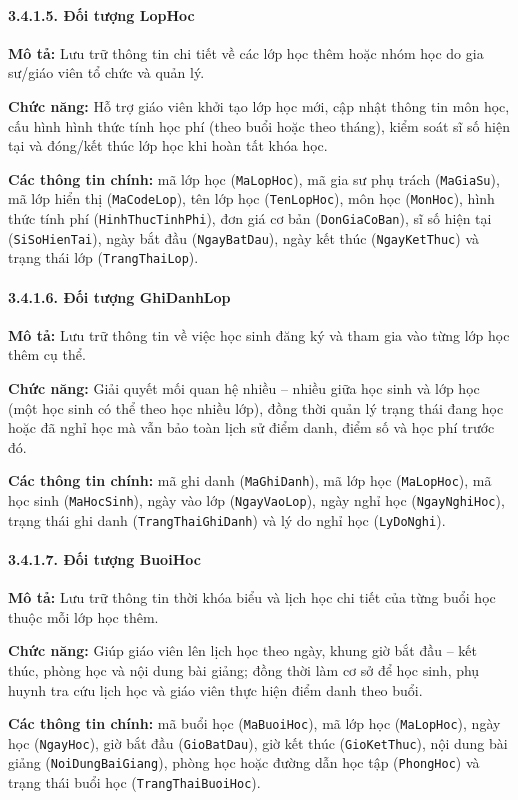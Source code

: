 \paragraph{3.4.1.5. Đối tượng LopHoc}\mbox{}\par
\textbf{Mô tả:} Lưu trữ thông tin chi tiết về các lớp học thêm hoặc nhóm học do gia sư/giáo viên tổ chức và quản lý.\par
\textbf{Chức năng:} Hỗ trợ giáo viên khởi tạo lớp học mới, cập nhật thông tin môn học, cấu hình hình thức tính học phí (theo buổi hoặc theo tháng), kiểm soát sĩ số hiện tại và đóng/kết thúc lớp học khi hoàn tất khóa học.\par
\textbf{Các thông tin chính:} mã lớp học (\texttt{MaLopHoc}), mã gia sư phụ trách (\texttt{MaGiaSu}), mã lớp hiển thị (\texttt{MaCodeLop}), tên lớp học (\texttt{TenLopHoc}), môn học (\texttt{MonHoc}), hình thức tính phí (\texttt{HinhThucTinhPhi}), đơn giá cơ bản (\texttt{DonGiaCoBan}), sĩ số hiện tại (\texttt{SiSoHienTai}), ngày bắt đầu (\texttt{NgayBatDau}), ngày kết thúc (\texttt{NgayKetThuc}) và trạng thái lớp (\texttt{TrangThaiLop}).

\paragraph{3.4.1.6. Đối tượng GhiDanhLop}\mbox{}\par
\textbf{Mô tả:} Lưu trữ thông tin về việc học sinh đăng ký và tham gia vào từng lớp học thêm cụ thể.\par
\textbf{Chức năng:} Giải quyết mối quan hệ nhiều -- nhiều giữa học sinh và lớp học (một học sinh có thể theo học nhiều lớp), đồng thời quản lý trạng thái đang học hoặc đã nghỉ học mà vẫn bảo toàn lịch sử điểm danh, điểm số và học phí trước đó.\par
\textbf{Các thông tin chính:} mã ghi danh (\texttt{MaGhiDanh}), mã lớp học (\texttt{MaLopHoc}), mã học sinh (\texttt{MaHocSinh}), ngày vào lớp (\texttt{NgayVaoLop}), ngày nghỉ học (\texttt{NgayNghiHoc}), trạng thái ghi danh (\texttt{TrangThaiGhiDanh}) và lý do nghỉ học (\texttt{LyDoNghi}).

\paragraph{3.4.1.7. Đối tượng BuoiHoc}\mbox{}\par
\textbf{Mô tả:} Lưu trữ thông tin thời khóa biểu và lịch học chi tiết của từng buổi học thuộc mỗi lớp học thêm.\par
\textbf{Chức năng:} Giúp giáo viên lên lịch học theo ngày, khung giờ bắt đầu -- kết thúc, phòng học và nội dung bài giảng; đồng thời làm cơ sở để học sinh, phụ huynh tra cứu lịch học và giáo viên thực hiện điểm danh theo buổi.\par
\textbf{Các thông tin chính:} mã buổi học (\texttt{MaBuoiHoc}), mã lớp học (\texttt{MaLopHoc}), ngày học (\texttt{NgayHoc}), giờ bắt đầu (\texttt{GioBatDau}), giờ kết thúc (\texttt{GioKetThuc}), nội dung bài giảng (\texttt{NoiDungBaiGiang}), phòng học hoặc đường dẫn học tập (\texttt{PhongHoc}) và trạng thái buổi học (\texttt{TrangThaiBuoiHoc}).

